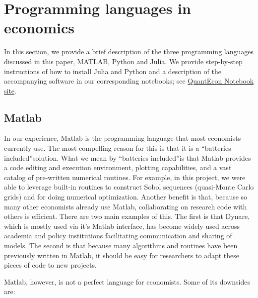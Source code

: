 
\section{Programming languages in economics}

In this section, we provide a brief description of the three programming
languages discussed in this paper, MATLAB, Python and Julia. We provide step-by-step
instructions of how to install Julia and Python and a description of the accompanying
software in our corresponding notebooks; see \href{http://notes.quantecon.org}{QuantEcon Notebook site}.

\subsection{Matlab}

In our experience, Matlab is the programming language that most economists
currently use. The most compelling reason for this is that it is a
\textquotedblleft batteries included\textquotedblright solution. What we mean
by \textquotedblleft batteries included\textquotedblright is that Matlab
provides a code editing and execution environment, plotting capabilities, and a
vast catalog of pre-written numerical routines. For example, in this project,
we were able to leverage built-in routines to construct Sobol sequences
(quasi-Monte Carlo grids) and for doing numerical optimization. Another benefit
is that, because so many other economists already use Matlab, collaborating on
research code with others is efficient. There are two main examples of this.
The first is that Dynare, which is mostly used via it's Matlab interface, has become widely used
across academia and policy institutions facilitating communication and sharing
of models. The second is that because many algorithms and routines have been
previously written in Matlab, it should be easy for researchers to adapt these
pieces of code to new projects.

Matlab, however, is not a perfect language for economists. Some of its
downsides are:

